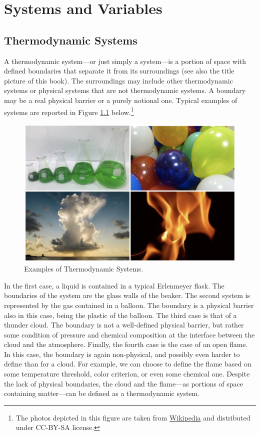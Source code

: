 \documentclass[
]{book}
\theoremstyle{definition}
\theoremstyle{definition}
\theoremstyle{definition}
\theoremstyle{remark}
\begin{document}
\hypertarget{SystemVariables}{%
\chapter{Systems and Variables}\label{SystemVariables}}

\hypertarget{thermodynamic-systems}{%
\section{Thermodynamic Systems}\label{thermodynamic-systems}}

A thermodynamic system---or just simply a system---is a portion of space with defined boundaries that separate it from its surroundings (see also the title picture of this book). The surroundings may include other thermodynamic systems or physical systems that are not thermodynamic systems. A boundary may be a real physical barrier or a purely notional one. Typical examples of systems are reported in Figure \ref{fig:Fig1c1} below.\footnote{The photos depicted in this figure are taken from \href{https://en.wikipedia.org}{Wikipedia} and distributed under CC-BY-SA license.}

\begin{figure}

{\centering \includegraphics[width=0.8\linewidth]{./img/OEP_Figures.001} 

}

\caption{Examples of Thermodynamic Systems.}\label{fig:Fig1c1}
\end{figure}

In the first case, a liquid is contained in a typical Erlenmeyer flask. The boundaries of the system are the glass walls of the beaker. The second system is represented by the gas contained in a balloon. The boundary is a physical barrier also in this case, being the plastic of the balloon. The third case is that of a thunder cloud. The boundary is not a well-defined physical barrier, but rather some condition of pressure and chemical composition at the interface between the cloud and the atmosphere. Finally, the fourth case is the case of an open flame. In this case, the boundary is again non-physical, and possibly even harder to define than for a cloud. For example, we can choose to define the flame based on some temperature threshold, color criterion, or even some chemical one. Despite the lack of physical boundaries, the cloud and the flame---as portions of space containing matter---can be defined as a thermodynamic system.
\end{document}
